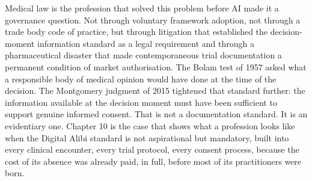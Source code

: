 Medical law is the profession that solved this problem before AI made it a governance question. Not through voluntary framework adoption, not through a trade body code of practice, but through litigation that established the decision-moment information standard as a legal requirement and through a pharmaceutical disaster that made contemporaneous trial documentation a permanent condition of market authorisation. The Bolam test of 1957 asked what a responsible body of medical opinion would have done at the time of the decision. The Montgomery judgment of 2015 tightened that standard further: the information available at the decision moment must have been sufficient to support genuine informed consent. That is not a documentation standard. It is an evidentiary one. Chapter 10 is the case that shows what a profession looks like when the Digital Alibi standard is not aspirational but mandatory, built into every clinical encounter, every trial protocol, every consent process, because the cost of its absence was already paid, in full, before most of its practitioners were born.
